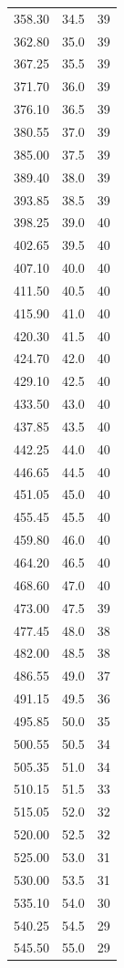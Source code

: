 \documentclass[12pt]{article}
\begin{document}
\begin{small}
\begin{longtable}{S[table-format=3.2] S[table-format=2.1] S[table-format=2.0]}
358.30 & 34.5 & 39 \\
362.80 & 35.0 & 39 \\
367.25 & 35.5 & 39 \\
371.70 & 36.0 & 39 \\
376.10 & 36.5 & 39 \\
380.55 & 37.0 & 39 \\
385.00 & 37.5 & 39 \\
389.40 & 38.0 & 39 \\
393.85 & 38.5 & 39 \\
398.25 & 39.0 & 40 \\
402.65 & 39.5 & 40 \\
407.10 & 40.0 & 40 \\
411.50 & 40.5 & 40 \\
415.90 & 41.0 & 40 \\
420.30 & 41.5 & 40 \\
424.70 & 42.0 & 40 \\
429.10 & 42.5 & 40 \\
433.50 & 43.0 & 40 \\
437.85 & 43.5 & 40 \\
442.25 & 44.0 & 40 \\
446.65 & 44.5 & 40 \\
451.05 & 45.0 & 40 \\
455.45 & 45.5 & 40 \\
459.80 & 46.0 & 40 \\
464.20 & 46.5 & 40 \\
468.60 & 47.0 & 40 \\
473.00 & 47.5 & 39 \\
477.45 & 48.0 & 38 \\
482.00 & 48.5 & 38 \\
486.55 & 49.0 & 37 \\
491.15 & 49.5 & 36 \\
495.85 & 50.0 & 35 \\
500.55 & 50.5 & 34 \\
505.35 & 51.0 & 34 \\
510.15 & 51.5 & 33 \\
515.05 & 52.0 & 32 \\
520.00 & 52.5 & 32 \\
525.00 & 53.0 & 31 \\
530.00 & 53.5 & 31 \\
535.10 & 54.0 & 30 \\
540.25 & 54.5 & 29 \\
545.50 & 55.0 & 29 \\

\end{longtable}
\end{small}
\end{document}

